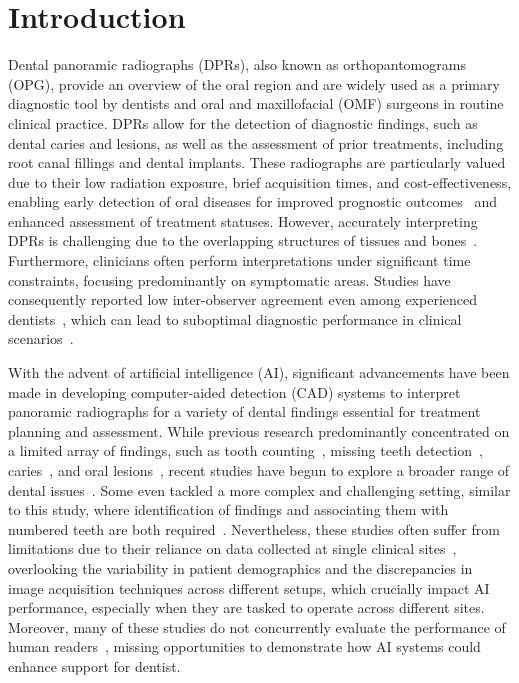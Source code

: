 \section{Introduction}

Dental panoramic radiographs (DPRs), also known as orthopantomograms (OPG), provide an overview of the oral region and are widely used as a primary diagnostic tool by dentists and oral and maxillofacial (OMF) surgeons in routine clinical practice.
DPRs allow for the detection of diagnostic findings, such as dental caries and lesions, as well as the assessment of prior treatments, including root canal fillings and dental implants.
These radiographs are particularly valued due to their low radiation exposure, brief acquisition times, and cost-effectiveness, enabling early detection of oral diseases for improved prognostic outcomes~\citep{choi2011assessment} and enhanced assessment of treatment statuses.
However, accurately interpreting DPRs is challenging due to the overlapping structures of tissues and bones~\citep{fourcade2019deep}. 
Furthermore, clinicians often perform interpretations under significant time constraints, focusing predominantly on symptomatic areas.
Studies have consequently reported low inter-observer agreement even among experienced dentists~\citep{kweon2018panoramic}, which can lead to suboptimal diagnostic performance in clinical scenarios~\citep{plessas2019impact}.

With the advent of artificial intelligence (AI), significant advancements have been made in developing computer-aided detection (CAD) systems to interpret panoramic radiographs for a variety of dental findings essential for treatment planning and assessment.
While previous research predominantly concentrated on a limited array of findings, such as tooth counting~\citep{oktay2017tooth, koch2019accurate}, missing teeth detection~\citep{tuzoff2019tooth, kim2020automatic, xu2023robust}, caries~\citep{dayi2023novel, zhu2022cariesnet, oztekin2023explainable, lian2021deep}, and oral lesions~\citep{endres2020development, yang2020deep}, recent studies have begun to explore a broader range of dental issues~\citep{muresan2020teeth, vinayahalingam2021automated, rohrer2022segmentation, almalki2022deep, bacsaran2022diagnostic}.
Some even tackled a more complex and challenging setting, similar to this study, where identification of findings and associating them with numbered teeth are both required~\citep{gardiyanouglu2023automatic,van2024combining}.
Nevertheless, these studies often suffer from limitations due to their reliance on data collected at single clinical sites~\citep{muresan2020teeth, rohrer2022segmentation, bacsaran2022diagnostic, lian2021deep, endres2020development, yang2020deep}, overlooking the variability in patient demographics and the discrepancies in image acquisition techniques across different setups, which crucially impact AI performance, especially when they are tasked to operate across different sites.
Moreover, many of these studies do not concurrently evaluate the performance of human readers~\citep{muresan2020teeth, rohrer2022segmentation, almalki2022deep, bacsaran2022diagnostic}, missing opportunities to demonstrate how AI systems could enhance support for dentist.

